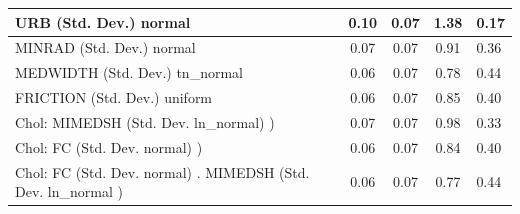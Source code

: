 \begin{table}
\begin{center}
\begin{tabular}{|l|l|c|c|c|l|}
			\hline
			URB (Std. Dev.) normal &  & 0.10 & 0.07 & 1.38 & 0.17 \\
			\hline
			MINRAD (Std. Dev.) normal &  & 0.07 & 0.07 & 0.91 & 0.36 \\
			\hline
			MEDWIDTH (Std. Dev.) tn_normal &  & 0.06 & 0.07 & 0.78 & 0.44 \\
			\hline
			FRICTION (Std. Dev.) uniform &  & 0.06 & 0.07 & 0.85 & 0.40 \\
			\hline
			 Chol: MIMEDSH (Std. Dev. ln_normal) ) &  & 0.07 & 0.07 & 0.98 & 0.33 \\
			\hline
			 Chol: FC (Std. Dev. normal) ) &  & 0.06 & 0.07 & 0.84 & 0.40 \\
			\hline
			 Chol: FC (Std. Dev. normal) . MIMEDSH (Std. Dev.   ln_normal ) &  & 0.06 & 0.07 & 0.77 & 0.44 \\
			\hline
		\end{tabular}
	\end{center}
\end{table}